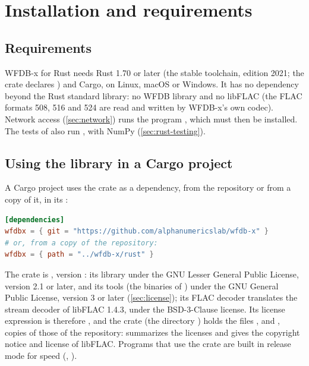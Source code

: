 \section{Installation and requirements}
\label{sec:rust-install}

\subsection{Requirements}

WFDB-x for Rust needs Rust 1.70 or later (the stable toolchain, edition 2021; the crate
declares ) and Cargo, on Linux, macOS or Windows. It has no
dependency beyond the Rust standard library: no WFDB library and no libFLAC (the FLAC
formats 508, 516 and 524 are read and written by WFDB-x's own codec). Network access
(\cref{sec:network}) runs the program , which must then be installed. The tests
of  also run , with NumPy (\cref{sec:rust-testing}).

\subsection{Using the library in a Cargo project}

A Cargo project uses the crate as a dependency, from the repository or from a copy of it,
in its :

\begin{lstlisting}[language=TOML]
[dependencies]
wfdbx = { git = "https://github.com/alphanumericslab/wfdb-x" }
# or, from a copy of the repository:
wfdbx = { path = "../wfdb-x/rust" }
\end{lstlisting}

The crate is , version : its library under the GNU Lesser
General Public License, version 2.1 or later, and its tools (the binaries of
) under the GNU General Public License, version 3 or later
(\cref{sec:license}); its FLAC decoder translates the stream decoder of libFLAC 1.4.3,
under the BSD-3-Clause license. Its license expression is therefore
, and the crate (the
directory ) holds the files ,  and
, copies of those of the repository:  summarizes the licenses
and gives the copyright notice and license of libFLAC. Programs that use the crate are
built in release mode for speed (, ).

